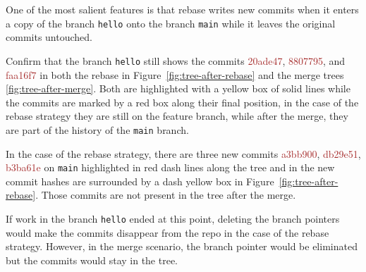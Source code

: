 \documentclass[10pt]{article}
\begin{document}
One of the most salient features is that rebase writes new commits when it enters a copy of the branch \texttt{hello} onto the branch \texttt{main} while it leaves the original commits untouched.

Confirm that the branch \texttt{hello} still shows the commits \textcolor{brown}{20ade47}, \textcolor{brown}{8807795}, and \textcolor{brown}{faa16f7} in both the rebase in Figure~\ref{fig:tree-after-rebase} and the merge trees \ref{fig:tree-after-merge}.
Both are highlighted with a yellow box of solid lines while the commits are marked by a red box along their final position, in the case of the rebase strategy they are still on the feature branch, while after the merge, they are part of the history of the \texttt{main} branch.

In the case of the rebase strategy, there are three new commits \textcolor{brown}{a3bb900}, \textcolor{brown}{db29e51}, \textcolor{brown}{b3ba61e} on \texttt{main} highlighted in red dash lines along the tree and in the new commit hashes are surrounded by a dash yellow box in  Figure~\ref{fig:tree-after-rebase}. Those commits are not present in the tree after the merge. 

If work in the branch \texttt{hello} ended at this point, deleting the branch pointers would make the commits disappear from the repo in the case of the rebase strategy. 
However, in the merge scenario, the branch pointer would be eliminated but the commits would stay in the tree.




\end{document}
